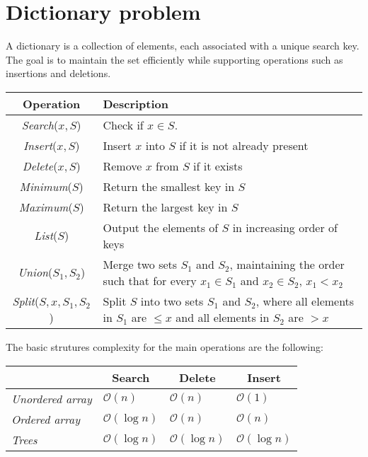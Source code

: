 \section{Dictionary problem}

A dictionary is a collection of elements, each associated with a unique search key.
The goal is to maintain the set efficiently while supporting operations such as insertions and deletions.
\renewcommand*{\arraystretch}{2}
\begin{table}[H]
    \centering
    \begin{tabular}{|c|l|} \hline
        \textbf{Operation} & \textbf{Description} \\ \hline
        \textit{Search}($x, S$) & Check if $x \in S$. \\ \hline
        \textit{Insert}($x, S$) & Insert $x$ into $S$ if it is not already present \\ \hline
        \textit{Delete}($x, S$) & Remove $x$ from $S$ if it exists \\ \hline
        \textit{Minimum}($S$) & Return the smallest key in $S$ \\ \hline
        \textit{Maximum}($S$) & Return the largest key in $S$ \\ \hline
        \textit{List}($S$) & Output the elements of $S$ in increasing order of keys \\ \hline
        \textit{Union}($S_1, S_2$) & \makecell[l]{Merge two sets $S_1$ and $S_2$, maintaining the order such that \\ for every $x_1 \in S_1$ and $x_2 \in S_2$, $x_1 < x_2$} \\ \hline
        \textit{Split}($S, x, S_1, S_2$) & \makecell[l]{Split $S$ into two sets $S_1$ and $S_2$, where all elements in \\ $S_1$ are $\leq x$ and all elements in $S_2$ are $> x$} \\ \hline
    \end{tabular}
\end{table}

The basic strutures complexity for the main operations are the following: 
\begin{table}[H]
    \centering
    \begin{tabular}{l|l|l|l|}
    \cline{2-4}
                                                   & \multicolumn{1}{c|}{\textbf{Search}} & \multicolumn{1}{c|}{\textbf{Delete}} & \multicolumn{1}{c|}{\textbf{Insert}} \\ \hline
    \multicolumn{1}{|l|}{\textit{Unordered array}} & $\mathcal{O}(n)$                     & $\mathcal{O}(n)$                     & $\mathcal{O}(1)$                     \\ \hline
    \multicolumn{1}{|l|}{\textit{Ordered array}}   & $\mathcal{O}(\log n)$                & $\mathcal{O}(n)$                     & $\mathcal{O}(n)$                     \\ \hline
    \multicolumn{1}{|l|}{\textit{Trees}}           & $\mathcal{O}(\log n)$                & $\mathcal{O}(\log n)$                & $\mathcal{O}(\log n)$                \\ \hline
    \end{tabular}
\end{table}
\renewcommand*{\arraystretch}{1}
